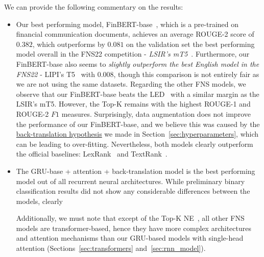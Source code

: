 We can provide the following commentary on the results:
\begin{itemize}
    \item Our best performing model, FinBERT-base~\cite{yang2020finbert}, which is a pre-trained on financial communication documents,
        achieves an average ROUGE-2 score of $0.382$, which outperforms by $0.081$ on the validation set the best performing
        model overall in the FNS22 competition - \emph{LSIR's mT5}~\cite{foroutan-etal-2022-multilingual}.
        Furthermore, our FinBERT-base also seems to \emph{slightly outperform the best English model in the FNS22} - LIPI's T5~\cite{el-haj-etal-2022-financial} with $0.008$,
        though this comparison is not entirely fair as we are not using the same datasets.
        Regarding the other FNS models, we observe that our FinBERT-base beats the LED~\cite{khanna-etal-2022-transformer} with a similar margin as the LSIR's mT5.
        However, the Top-K remains with the highest ROUGE-1 and ROUGE-2 $F1$ measures.
        Surprisingly, data augmentation does not improve the performance of our FinBERT-base, and we believe this was caused by
        the \hyperlink{data_augment_hypothesis}{back-translation hypothesis} we made in Section~\ref{sec:hyperparameters}, which can be leading to over-fitting.
        Nevertheless, both models clearly outperform the official baselines: LexRank~\cite{Erkan2004LexRankGC} and TextRank~\cite{mihalcea-tarau-2004-textrank}.
    \item The GRU-base + attention + back-translation model is the best performing model out of all recurrent neural architectures.
    While preliminary binary classification results did not show any considerable differences between the models, clearly
    Additionally, we must note that except of the Top-K NE~\cite{shukla-etal-2022-dimsum}, all other FNS models are transformer-based,
    hence they have more complex architectures and attention mechanisms than our GRU-based models with single-head attention (Sections~\ref{sec:transformers} and~\ref{sec:rnn_model}).

\end{itemize}
